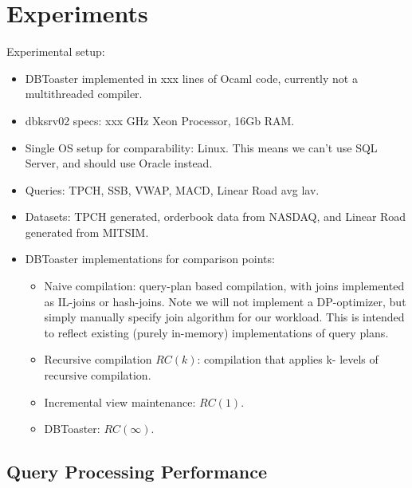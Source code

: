 \documentclass{sig-alternate}
\begin{document}
\section{Experiments}
Experimental setup:
\begin{itemize}
\item DBToaster implemented in xxx lines of Ocaml code, currently not a
  multithreaded compiler.
\item dbksrv02 specs: xxx GHz Xeon Processor, 16Gb RAM.
\item Single OS setup for comparability: Linux. This means we can't use SQL
  Server, and should use Oracle instead.
\item Queries: TPCH, SSB, VWAP, MACD, Linear Road avg lav.
\item Datasets: TPCH generated, orderbook data from NASDAQ, and Linear Road
  generated from MITSIM.
\item DBToaster implementations for comparison points:
    \begin{itemize}
    \item Naive compilation: query-plan based compilation, with joins
      implemented as IL-joins or hash-joins. Note we will not implement a
      DP-optimizer, but simply manually specify join algorithm for our workload.
      This is intended to reflect existing (purely in-memory) implementations of
      query plans.
    \item Recursive compilation $RC(k)$: compilation that applies k- levels of
      recursive compilation.
    \item Incremental view maintenance: $RC(1)$.
    \item DBToaster: $RC(\infty)$.
    \end{itemize}
\end{itemize}

\subsection{Query Processing Performance}
\end{document}
